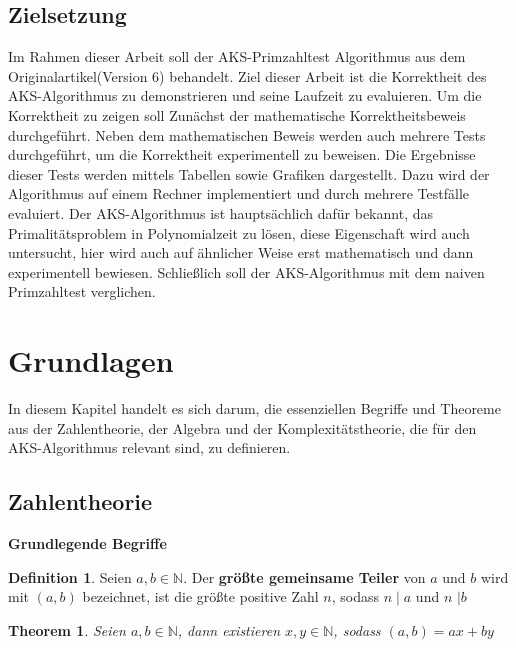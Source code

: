 \documentclass[12pt,oneside]{article}
\newtheorem{theorem}{Theorem}[section]
\theoremstyle{remark}
\theoremstyle{definition}
\newtheorem{definition}{Definition}[section]
\begin{document}
\subsection{Zielsetzung}
Im Rahmen dieser  Arbeit soll der AKS-Primzahltest Algorithmus aus dem Originalartikel(Version 6) behandelt. Ziel dieser Arbeit ist die Korrektheit des AKS-Algorithmus zu demonstrieren und seine Laufzeit zu evaluieren. Um die Korrektheit zu zeigen soll Zunächst der mathematische Korrektheitsbeweis durchgeführt. Neben dem mathematischen Beweis werden auch mehrere Tests durchgeführt, um die Korrektheit experimentell zu beweisen. Die Ergebnisse dieser Tests werden mittels Tabellen sowie Grafiken dargestellt. Dazu wird der Algorithmus auf einem Rechner implementiert und durch mehrere Testfälle evaluiert. Der AKS-Algorithmus ist hauptsächlich dafür bekannt, das Primalitätsproblem in Polynomialzeit zu lösen, diese Eigenschaft wird auch untersucht, hier wird auch auf ähnlicher Weise erst mathematisch und dann experimentell bewiesen. Schließlich soll der AKS-Algorithmus mit dem naiven Primzahltest verglichen.  


\newpage


\section{Grundlagen}
In diesem Kapitel handelt es sich darum, die essenziellen Begriffe und Theoreme aus der Zahlentheorie, der Algebra und der Komplexitätstheorie, die für den AKS-Algorithmus relevant sind, zu definieren.

\smallskip


\subsection{Zahlentheorie}
\textbf{Grundlegende Begriffe}
\theoremstyle{definition}
\begin{definition}\label{Df_1}
Seien $a,b \in \mathbb{N}$. Der \textbf{größte gemeinsame Teiler} von $a$ und $b$ wird mit $(a,b)$ bezeichnet, ist die größte positive Zahl $n$, sodass $n \mid a$ und $n$ $ \mid b$
\end{definition}

\smallskip

\begin{theorem}
Seien $a,b \in \mathbb{N}$, dann existieren $x,y \in \mathbb{N}$, sodass $(a,b) = ax + by$ 
\end{theorem}
\end{document}
